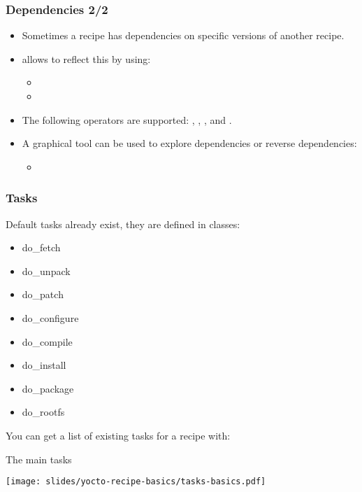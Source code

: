 \begin{frame}
  \frametitle{Dependencies 2/2}
  \begin{itemize}
    \item Sometimes a recipe has dependencies on specific versions
      of another recipe.
    \item {} allows to reflect this by using:
    \begin{itemize}
      \item {}
      \item {}
    \end{itemize}
    \item The following operators are supported: \code{=}, \code{>},
      \code{<}, \code{>=} and \code{<=}.
    \item A graphical tool can be used to explore dependencies or
      reverse dependencies:
    \begin{itemize}
      \item {}
    \end{itemize}
  \end{itemize}
\end{frame}

\begin{frame}[fragile]
  \frametitle{Tasks}
  Default tasks already exist, they are defined in classes:
  \begin{itemize}
    \item do\_fetch
    \item do\_unpack
    \item do\_patch
    \item do\_configure
    \item do\_compile
    \item do\_install
    \item do\_package
    \item do\_rootfs
  \end{itemize}
  You can get a list of existing tasks for a recipe with:
\end{frame}

\begin{frame}{The main tasks}
  \begin{center}
    \texttt{[image: slides/yocto-recipe-basics/tasks-basics.pdf]}
  \end{center}
\end{frame}

